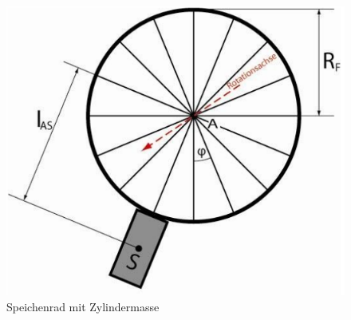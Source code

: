 \documentclass[12pt,a4paper]{article}
\begin{document}
\begin{multicols}{2}
\begin{figure}[H]
	\centering
  	\includegraphics[scale=0.45]{./figure/speichenrad.png}
	\caption{Speichenrad mit Zylindermasse}
	\label{fig:rad}
\end{figure}

\end{multicols}
\end{document}
